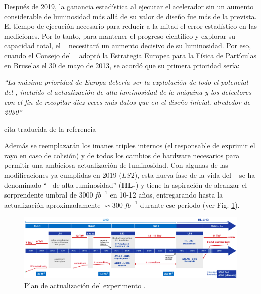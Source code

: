 Después de 2019, la ganancia estadística al ejecutar el acelerador sin un aumento considerable de luminosidad más allá de su valor de diseño fue más de la prevista. El tiempo de ejecución necesario para reducir a la mitad el error estadístico en las mediciones. Por lo tanto, para mantener el progreso científico y explorar su capacidad total, el \LHC ~ necesitará un aumento decisivo de su luminosidad. Por eso, cuando el Consejo del \CERN ~ adoptó la Estrategia Europea para la Física de Partículas en Bruselas el 30 de mayo de 2013, se acordó que su primera prioridad sería:

\begin{minipage}{0.9\linewidth}
\vspace{5pt}%
{\small }
\textit{``La máxima prioridad de Europa debería ser la explotación de todo el potencial del \LHC, incluido el actualización de alta luminosidad de la máquina y los detectores con el fin de recopilar diez veces más datos que en el diseño inicial, alrededor de 2030''}
\begin{flushright}
cita traducida de la referencia \cite{wells_upgraded_2015}
\end{flushright}
\vspace{5pt}%
\end{minipage}

Además se reemplazarán los imanes triples internos (el responsable de exprimir el rayo en caso de colisión) y de todos los cambios de hardware necesarios para permitir una ambiciosa actualización de luminosidad. Con algunas de las modificaciones ya cumplidas en 2019 ($LS2$), esta nueva fase de la vida del \LHC ~ se ha denominado ``\LHC ~ de alta luminosidad'' (\textbf{HL-}\LHC) y tiene la aspiración de alcanzar el sorprendente umbral de $3000~fb^{-1}$ en 10-12 años, entregarando hasta la actualización aproximadamente $\backsim 300~fb^{-1}$ durante ese período (ver Fig. \ref{cms_actualiza}).


\begin{figure}[h!]
\centering
\includegraphics[width=1\textwidth]{Cap2/imagenes/CMS_upgrade.png}
\caption[Plan de actualización del experimento \LHC.]{Plan de actualización del experimento \LHC.\footnotemark}
\label{cms_actualiza}
\end{figure}

